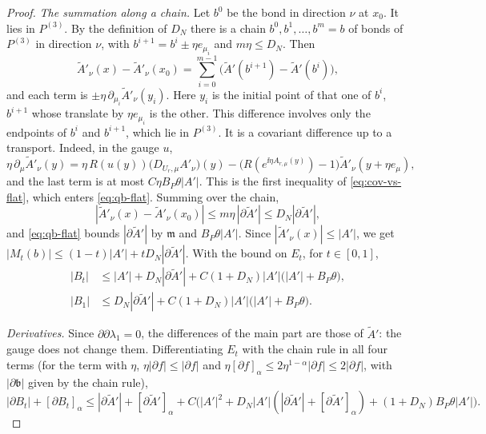 \begin{proof}
\emph{The summation along a chain.} Let $b^0$ be the bond in direction $\nu$ at $x_0$. It lies in $P^{(3)}$. By the definition of $D_N$ there is a chain $b^0,b^1,\dots,b^m=b$ of bonds of $P^{(3)}$ in direction $\nu$, with $b^{i+1}=b^i\pm\eta e_{\mu_i}$ and $m\eta\le D_N$. Then
\[
\tilde A'_\nu(x)-\tilde A'_\nu(x_0)=\sum_{i=0}^{m-1}\big(\tilde A'(b^{i+1})-\tilde A'(b^i)\big),
\]
and each term is $\pm\eta\,\partial_{\mu_i}\tilde A'_\nu(y_i)$. Here $y_i$ is the initial point of that one of $b^i$, $b^{i+1}$ whose translate by $\eta e_{\mu_i}$ is the other. This difference involves only the endpoints of $b^i$ and $b^{i+1}$, which lie in $P^{(3)}$. It is a covariant difference up to a transport. Indeed, in the gauge $u$,
\[
\eta\,\partial_\mu\tilde A'_\nu(y)=\eta\,R(u(y))\big(D_{U_r,\mu}A'_\nu\big)(y)-\big(R(e^{\ii\eta A_{r,\mu}(y)})-1\big)\tilde A'_\nu(y+\eta e_\mu),
\]
and the last term is at most $C\eta B_P\theta|A'|$. This is the first inequality of \eqref{eq:cov-vs-flat}, which enters \eqref{eq:qb-flat}. Summing over the chain,
\[
|\tilde A'_\nu(x)-\tilde A'_\nu(x_0)|\le m\eta\,|\partial\tilde A'|\le D_N|\partial\tilde A'|,
\]
and \eqref{eq:qb-flat} bounds $|\partial\tilde A'|$ by $\mathfrak m$ and $B_P\theta|A'|$. Since $|\tilde A'_\nu(x)|\le|A'|$, we get $|M_t(b)|\le(1-t)|A'|+tD_N|\partial\tilde A'|$. With the bound on $E_t$, for $t\in[0,1]$,
\begin{equation}\label{eq:qb-Bt}
\begin{aligned}
|B_t|&\le|A'|+D_N|\partial\tilde A'|+C(1+D_N)|A'|\big(|A'|+B_P\theta\big),\\
|B_1|&\le D_N|\partial\tilde A'|+C(1+D_N)|A'|\big(|A'|+B_P\theta\big).
\end{aligned}
\end{equation}

\emph{Derivatives.} Since $\partial\partial\lambda_1=0$, the differences of the main part are those of $\tilde A'$: the gauge does not change them. Differentiating $E_t$ with the chain rule in all four terms (for the term with $\eta$, $\eta|\partial f|\le|\partial f|$ and $\eta[\partial f]_\alpha\le2\eta^{1-\alpha}|\partial f|\le2|\partial f|$, with $|\partial\mathfrak b|$ given by the chain rule),
\begin{equation}\label{eq:qb-dBt}
|\partial B_t|+[\partial B_t]_\alpha\le|\partial\tilde A'|+[\partial\tilde A']_\alpha+C\big(|A'|^2+D_N|A'|(|\partial\tilde A'|+[\partial\tilde A']_\alpha)+(1+D_N)B_P\theta|A'|\big).
\end{equation}


\end{proof}
